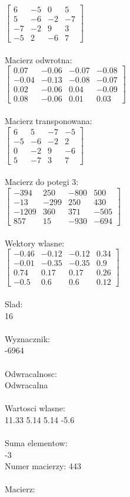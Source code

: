 \documentclass[a4paper,12pt]{article}
\begin{document}
$\begin{bmatrix} 6&-5&0&5\\5&-6&-2&-7\\-7&-2&9&3\\-5&2&-6&7 \end{bmatrix}$
\\
\\
Macierz odwrotna:\\

$\begin{bmatrix} 0.07&-0.06&-0.07&-0.08\\-0.04&-0.13&-0.08&-0.07\\0.02&-0.06&0.04&-0.09\\0.08&-0.06&0.01&0.03 \end{bmatrix}$
\\
\\
Macierz transponowana:\\

$\begin{bmatrix} 6&5&-7&-5\\-5&-6&-2&2\\0&-2&9&-6\\5&-7&3&7 \end{bmatrix}$
\\
\\
Macierz do potegi 3:\\

$\begin{bmatrix} -394&250&-800&500\\-13&-299&250&430\\-1209&360&371&-505\\857&15&-930&-694 \end{bmatrix}$
\\
\\
Wektory wlasne:\\

$\begin{bmatrix} -0.46&-0.12&-0.12&0.34\\-0.01&-0.35&-0.35&0.9\\0.74&0.17&0.17&0.26\\-0.5&0.6&0.6&0.12 \end{bmatrix}$
\\
\\
Slad:\\
16
\\
\\
Wyznacznik:\\
-6964
\\
\\
Odwracalnosc:\\
Odwracalna
\\
\\
Wartosci wlasne:\\
11.33 5.14 5.14 -5.6
\\
\\
Suma elementow:\\
-3
\\
\newpage
Numer macierzy:
443
\\
\\
Macierz:\\
\end{document}
